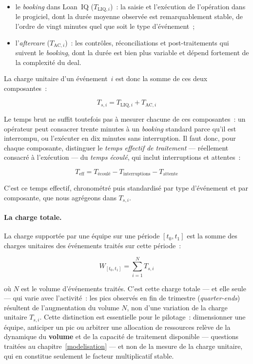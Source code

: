 \begin{itemize}
    \item le \textit{booking} dans Loan~IQ ($T_{\text{LIQ},i}$)~: la saisie et l'exécution de l'opération dans le progiciel, dont la durée moyenne observée est remarquablement stable, de l'ordre de vingt minutes quel que soit le type d'événement~;
    \item l'\textit{aftercare} ($T_{\text{AC},i}$)~: les contrôles, réconciliations et post-traitements qui suivent le \textit{booking}, dont la durée est bien plus variable et dépend fortement de la complexité du deal.
\end{itemize}

\noindent La charge unitaire d'un événement~$i$ est donc la somme de ces deux composantes~:

\begin{equation}
T_{s,i} = T_{\text{LIQ},i} + T_{\text{AC},i}
\label{eq:charge-unitaire}
\end{equation}

\noindent Le temps brut ne suffit toutefois pas à mesurer chacune de ces composantes~: un opérateur peut consacrer trente minutes à un \textit{booking} standard parce qu'il est interrompu, ou l'exécuter en dix minutes sans interruption. Il faut donc, pour chaque composante, distinguer le \textit{temps effectif de traitement} --- réellement consacré à l'exécution --- du \textit{temps écoulé}, qui inclut interruptions et attentes~:

\begin{equation}
T_{\text{eff}} = T_{\text{écoulé}} - T_{\text{interruptions}} - T_{\text{attente}}
\label{eq:temps-effectif}
\end{equation}

\noindent C'est ce temps effectif, chronométré puis standardisé par type d'événement et par composante, que nous agrégeons dans $T_{s,i}$.

\paragraph{La charge totale.}
La charge supportée par une équipe sur une période $[t_0, t_1]$ est la somme des charges unitaires des événements traités sur cette période~:

\begin{equation}
W_{[t_0,t_1]} = \sum_{i=1}^{N} T_{s,i}
\label{eq:charge-totale}
\end{equation}

\noindent où $N$ est le volume d'événements traités. C'est cette charge totale --- et elle seule --- qui varie avec l'activité~: les pics observés en fin de trimestre (\textit{quarter-ends}) résultent de l'augmentation du volume $N$, non d'une variation de la charge unitaire $T_{s,i}$. Cette distinction est essentielle pour le pilotage~: dimensionner une équipe, anticiper un pic ou arbitrer une allocation de ressources relève de la dynamique du \textbf{volume} et de la capacité de traitement disponible --- questions traitées au chapitre~\ref{modelisation} --- et non de la mesure de la charge unitaire, qui en constitue seulement le facteur multiplicatif stable.

